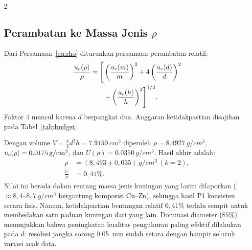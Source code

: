 \documentclass[a4paper, 12pt]{article}
\begin{document}
\begin{multicols}{2}
        \subsection{Perambatan ke Massa Jenis \texorpdfstring{$\rho$}{rho}}
        Dari Persamaan~\eqref{eq:rho} diturunkan persamaan perambatan relatif:
        \begin{equation}
            \begin{split}
                \frac{u_{c}(\rho)}{\rho} = \Biggl[
                    &\left(\frac{u_{c}(m)}{m}\right)^{2}
                    + 4\left(\frac{u_{c}(d)}{d}\right)^{2} \\
                    &+ \left(\frac{u_{c}(h)}{h}\right)^{2}
                \Biggr]^{1/2}.
            \end{split}
            \label{eq:urho}
        \end{equation}
        Faktor $4$ muncul karena $d$ berpangkat dua. Anggaran ketidakpastian disajikan pada Tabel~\ref{tab:budget}.

        Dengan volume $V=\tfrac{\pi}{4}d^2h=\SI{7,9150}{cm^3}$ diperoleh $\rho=\SI{8,4927}{g/cm^3}$, $u_{c}(\rho)=\SI{0,0175}{g/cm^3}$, dan $U(\rho)=\SI{0,0350}{g/cm^3}$. Hasil akhir adalah:
        \begin{equation}
            \boxed{
                \begin{aligned}
                    \rho &= (8{,}493\pm0{,}035)\ \si{g/cm^3}\ (k=2),\\
                    \frac{U}{\rho} &= 0{,}41\%.
                \end{aligned}
            }
        \end{equation}
        Nilai ini berada dalam rentang massa jenis kuningan yang lazim dilaporkan ($\approx 8{,}4$--$8{,}7\ \si{g/cm^3}$ bergantung komposisi Cu--Zn), sehingga hasil P1 konsisten secara fisis. Namun, ketidakpastian bentangan relatif $0{,}41\%$ terlalu sempit untuk membedakan satu paduan kuningan dari yang lain. Dominasi diameter ($85\%$) menunjukkan bahwa peningkatan kualitas pengukuran paling efektif dilakukan pada $d$: resolusi jangka sorong \SI{0,05}{mm} sudah setara dengan hampir seluruh variasi acak data.
\end{multicols}
\end{document}
